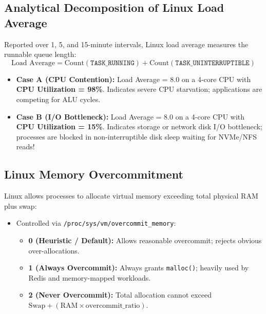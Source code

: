 \subsection{Analytical Decomposition of Linux Load Average}
Reported over 1, 5, and 15-minute intervals, Linux load average measures the runnable queue length:
\begin{equation}
\boxed{\text{Load Average} = \text{Count}(\texttt{TASK\_RUNNING}) + \text{Count}(\texttt{TASK\_UNINTERRUPTIBLE})}
\end{equation}
\begin{itemize}
    \item \textbf{Case A (CPU Contention):} Load Average = 8.0 on a 4-core CPU with \textbf{CPU Utilization = 98\%}. Indicates severe CPU starvation; applications are competing for ALU cycles.
    \item \textbf{Case B (I/O Bottleneck):} Load Average = 8.0 on a 4-core CPU with \textbf{CPU Utilization = 15\%}. Indicates storage or network disk I/O bottleneck; processes are blocked in non-interruptible disk sleep waiting for NVMe/NFS reads!
\end{itemize}

\subsection{Linux Memory Overcommitment}
Linux allows processes to allocate virtual memory exceeding total physical RAM plus swap:
\begin{itemize}
    \item Controlled via \texttt{/proc/sys/vm/overcommit\_memory}:
    \begin{itemize}
        \item \textbf{0 (Heuristic / Default):} Allows reasonable overcommit; rejects obvious over-allocations.
        \item \textbf{1 (Always Overcommit):} Always grants \texttt{malloc()}; heavily used by Redis and memory-mapped workloads.
        \item \textbf{2 (Never Overcommit):} Total allocation cannot exceed $\text{Swap} + (\text{RAM} \times \text{overcommit\_ratio})$.
    \end{itemize}
\end{itemize}

